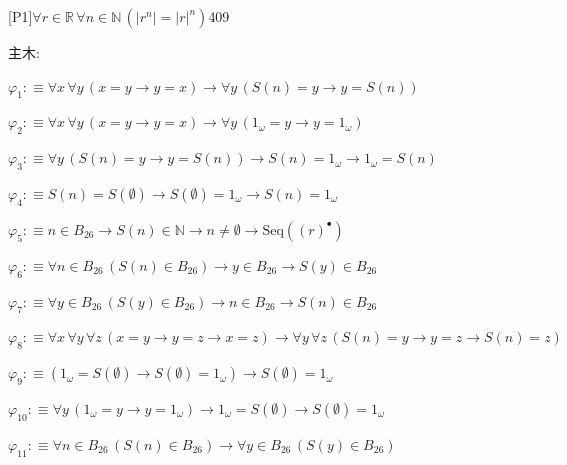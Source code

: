 \begin{fullproof}{[P1]}{$\forall r \in \mathbb{R}\,\forall n \in \mathbb{N}\,(\lvert {{r}^{n}} \rvert = {{\lvert r \rvert}^{n}})$}{409}
\begin{ptree}
\end{ptree}
\noindent 主木:
\begin{ptree}
\noLine
{}
\end{ptree}
\begin{abbrevlist}
\item $\varphi_{1} :\equiv \forall x\,\forall y\,(x = y \to y = x) \to \forall y\,(S(n) = y \to y = S(n))$
\item $\varphi_{2} :\equiv \forall x\,\forall y\,(x = y \to y = x) \to \forall y\,(1_{\omega} = y \to y = 1_{\omega})$
\item $\varphi_{3} :\equiv \forall y\,(S(n) = y \to y = S(n)) \to S(n) = 1_{\omega} \to 1_{\omega} = S(n)$
\item $\varphi_{4} :\equiv S(n) = S(\emptyset) \to S(\emptyset) = 1_{\omega} \to S(n) = 1_{\omega}$
\item $\varphi_{5} :\equiv n \in B_{26} \to S(n) \in \mathbb{N} \to n \neq \emptyset \to \mathrm{Seq}({(r)^{\bullet}})$
\item $\varphi_{6} :\equiv \forall n \in B_{26}\,(S(n) \in B_{26}) \to y \in B_{26} \to S(y) \in B_{26}$
\item $\varphi_{7} :\equiv \forall y \in B_{26}\,(S(y) \in B_{26}) \to n \in B_{26} \to S(n) \in B_{26}$
\item $\varphi_{8} :\equiv \forall x\,\forall y\,\forall z\,(x = y \to y = z \to x = z) \to \forall y\,\forall z\,(S(n) = y \to y = z \to S(n) = z)$
\item $\varphi_{9} :\equiv (1_{\omega} = S(\emptyset) \to S(\emptyset) = 1_{\omega}) \to S(\emptyset) = 1_{\omega}$
\item $\varphi_{10} :\equiv \forall y\,(1_{\omega} = y \to y = 1_{\omega}) \to 1_{\omega} = S(\emptyset) \to S(\emptyset) = 1_{\omega}$
\item $\varphi_{11} :\equiv \forall n \in B_{26}\,(S(n) \in B_{26}) \to \forall y \in B_{26}\,(S(y) \in B_{26})$

\end{abbrevlist}
\end{fullproof}
